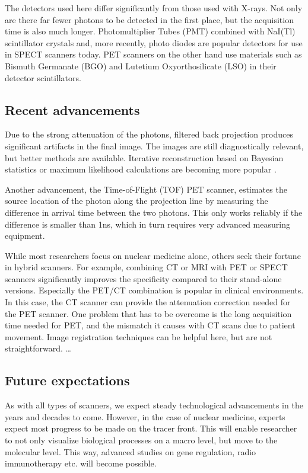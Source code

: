 The detectors used here differ significantly from those used with X-rays. Not
only are there far fewer photons to be detected in the first place, but the
acquisition time is also much longer. Photomultiplier Tubes (PMT) combined with
NaI(Tl) scintillator crystals and, more recently, photo diodes are popular
detectors for use in SPECT scanners today. PET scanners on the other hand use
materials such as Bismuth Germanate (BGO) and Lutetium Oxyorthosilicate (LSO) in
their detector scintillators.

\subsection{Recent advancements}
Due to the strong attenuation of the photons, filtered back projection produces
significant artifacts in the final image. The images are still diagnostically
relevant, but better methods are available. Iterative reconstruction based on
Bayesian statistics or maximum likelihood calculations are becoming more
popular \cite{suetens}.

Another advancement, the Time-of-Flight (TOF) PET scanner, estimates the
source location of the photon along the projection line by measuring the
difference in arrival time between the two photons. This only works reliably if
the difference is smaller than 1ns, which in turn requires very advanced measuring
equipment.

While most researchers focus on nuclear medicine alone, others seek their
fortune in hybrid scanners. For example, combining CT or MRI with PET or SPECT
scanners significantly improves the specificity compared to their stand-alone
versions. Especially the PET/CT combination is popular in clinical environments.
In this case, the CT scanner can provide the attenuation correction needed for
the PET scanner. One problem that has to be overcome is the long acquisition
time needed for PET, and the mismatch it causes with CT scans due to patient
movement. Image registration techniques can be helpful here, but are not
straightforward.
\ldots

\subsection{Future expectations}
As with all types of scanners, we expect steady technological advancements in
the years and decades to come. However, in the case of nuclear medicine, experts
expect most progress to be made on the tracer front. This will enable researcher
to not only visualize biological processes on a macro level, but move to the
molecular level. This way, advanced studies on gene regulation, radio
immunotherapy etc. will become possible.